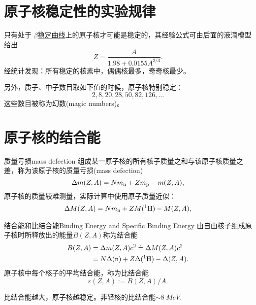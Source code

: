 \section{原子核稳定性的实验规律}

只有处于
\href{https://www.nndc.bnl.gov/nudat3/}{$\beta$稳定曲线}上的原子核才可能是稳定的，其经验公式可由后面的液滴模型给出
\[
	Z=\frac A{1.98 + 0.0155A^{2/3}}.
\]
经统计发现：所有稳定的核素中，偶偶核最多，奇奇核最少。

另外，质子、中子数目取如下值的时候，原子核特别稳定：
\[
	2,8,20,28,50,82,126,\ldots
\]
这些数目被称为幻数(magic numbers)。

\section{原子核的结合能}

\begin{definition}{质量亏损}{mass defection}
	组成某一原子核的所有核子质量之和与该原子核质量之差，称为该原子核的质量亏损(mass defection)
	\[
		\Delta m(Z,A)=Nm_\mathrm n+Zm_\mathrm p-m(Z,A),
	\]
	原子核的质量较难测量，实际计算中使用原子质量近似：
	\begin{align}
		\Delta M(Z,A)=Nm_\mathrm n+ZM({^{1}\mathrm{H}})-M(Z,A),
	\end{align}
\end{definition}
\begin{definition}{结合能和比结合能}{Binding Energy and Specific Binding Energy}
	由自由核子组成原子核时所释放出的能量$B(Z,A)$称为结合能
	\begin{align}\notag
		B(Z,A)&=\Delta m(Z,A)c^2\doteq\Delta M(Z,A)c^2\\
		&=N\Delta(\mathrm n)+Z\Delta({^{1}\mathrm{H}})-\Delta(Z,A).
	\end{align}
	原子核中每个核子的平均结合能，称为比结合能
	\[
		\varepsilon(Z,A):=B(Z,A)/A.
	\]
\end{definition}
比结合能越大，原子核越稳定。非轻核的比结合能$\sim\SI{8}{MeV}$.
